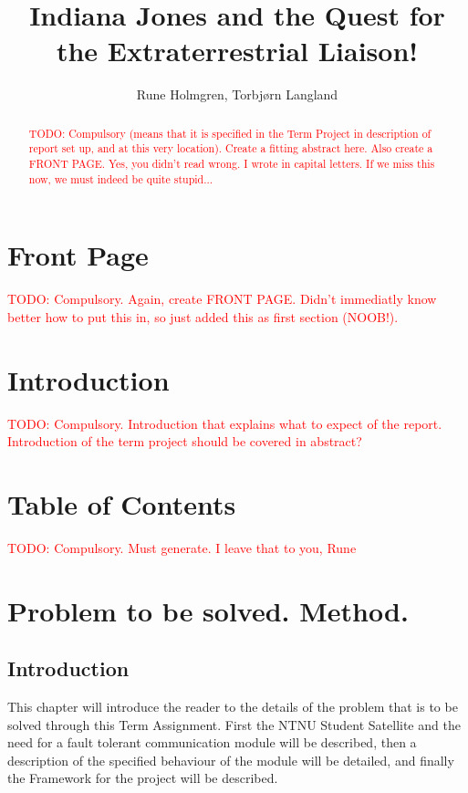 \documentclass[a4paper]{IEEEtran}
\title{Indiana Jones and the Quest for the Extraterrestrial Liaison!}
\author{
    Rune Holmgren,
    Torbjørn Langland
}
\newcommand\TODO[1]{\textcolor{red}{TODO:#1}}
\newcommand\todo[1]{\TODO{#1}}
\begin{document}
\maketitle

\begin{abstract}
    \todo{ Compulsory (means that it is specified in the Term Project in description of report set up, and at this very location). Create a fitting abstract here. Also create a FRONT PAGE. Yes, you didn't read wrong. I wrote in capital letters. If we miss this now, we must indeed be quite stupid...}
\end{abstract}

\section{Front Page}
\todo{ Compulsory. Again, create FRONT PAGE. Didn't immediatly know better how to put this in, so just added this as first section (NOOB!). }

\section{Introduction}
\todo{ Compulsory. Introduction that explains what to expect of the report. Introduction of the term project should be covered in abstract? }

\section{Table of Contents}
\todo{ Compulsory. Must generate. I leave that to you, Rune}

\section{Problem to be solved. Method.}
\subsection{Introduction}
This chapter will introduce the reader to the details of the problem that is to be solved through this Term Assignment. First the NTNU Student Satellite and the need for a fault tolerant communication module will be described, then a description of the specified behaviour of the module will be detailed, and finally the Framework for the project will be described.
\end{document}
